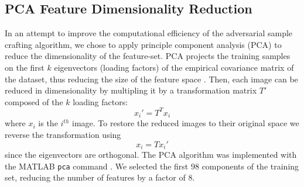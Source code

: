 \subsection{PCA Feature Dimensionality Reduction} \label{sec:pca}
In an attempt to improve the computational efficiency of the adversarial sample crafting algorithm, we chose to apply principle component analysis (PCA) to reduce the dimensionality of the feature-set. PCA projects the training samples on the first $k$ eigenvectors (loading factors) of the empirical covariance matrix of the dataset, thus reducing the size of the feature space \cite{coursenotes}. Then, each image can be reduced in dimensionality by multipling it by a transformation matrix $T'$ composed of the $k$ loading factors:
\begin{equation}
x_i' = T^T x_i
\end{equation}
where $x_i$ is the $i^{th}$ image. To restore the reduced images to their original space we reverse the transformation using
\begin{equation}
x_i = T x_i' 
\end{equation}
since the eigenvectors are orthogonal. The PCA algorithm was implemented with the MATLAB \texttt{pca} command \cite{matlab}. We selected the first $98$ components of the training set, reducing the number of features by a factor of $8$. 